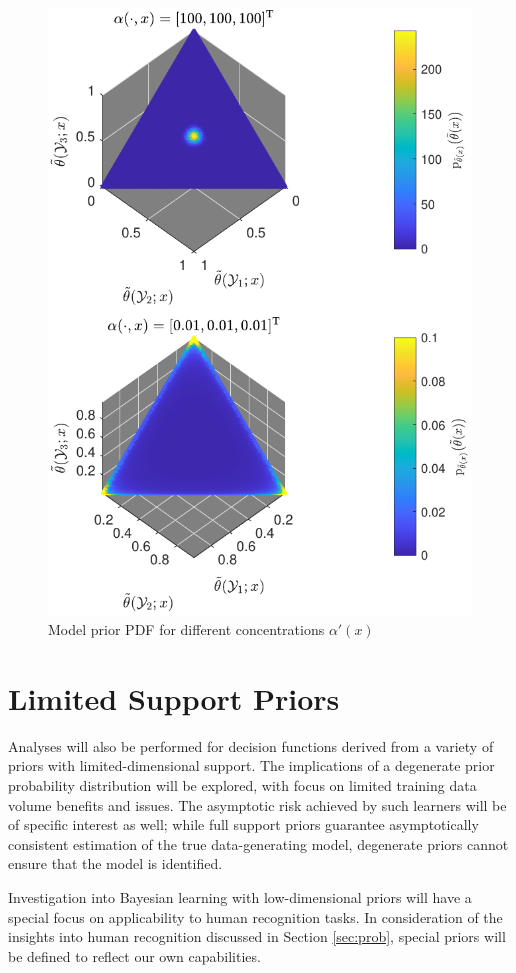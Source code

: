 \documentclass[12pt]{report}
\begin{document}
\begin{figure}
\centering
\includegraphics[width=0.7\linewidth]{P_theta_tilde.pdf}
\caption{Model prior PDF for different concentrations $\alpha'(x)$}
\end{figure}












\section{Limited Support Priors}

Analyses will also be performed for decision functions derived from a variety of priors with limited-dimensional support. The implications of a degenerate prior probability distribution will be explored, with focus on limited training data volume benefits and issues. The asymptotic risk achieved by such learners will be of specific interest as well; while full support priors guarantee asymptotically consistent estimation of the true data-generating model, degenerate priors cannot ensure that the model is identified. 

Investigation into Bayesian learning with low-dimensional priors will have a special focus on applicability to human recognition tasks. In consideration of the insights into human recognition discussed in Section \ref{sec:prob}, special priors will be defined to reflect our own capabilities. 
\end{document}

